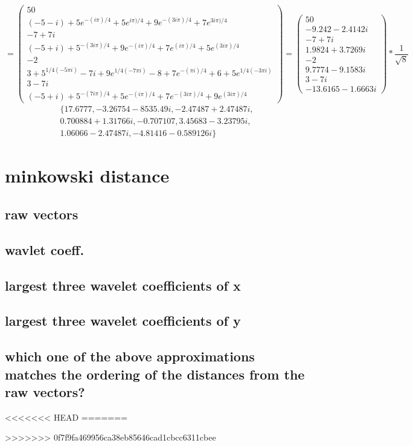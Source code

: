 \documentclass{article}
\begin{document}
\[
	=
	\begin{pmatrix}
	  50 \\
	  (-5-i)+5 e^{-(i \pi)/4}+5 e^{ i \pi)/4}+9 e^{-(3 i \pi)/4}+7 e^{3 i \pi)/4} \\
	  -7 + 7i \\
	  (-5+i)+5^{-(3 i \pi)/4}+9 e^{-(i \pi)/4}+7 e^{(i \pi)/4}+5 e^{(3 i \pi)/4} \\
	  -2 \\
	  3+5^{1/4 (-5 \pi i)}-7 i+9 e^{1/4 (-7 \pi i)}-8+7 e^{-(\pi i)/4}+6+5 e^{1/4 (-3 \pi i)} \\
	  3 - 7i \\
	  (-5+i)+5^{-(7 i \pi)/4}+5 e^{-(i \pi)/4}+7 e^{-(3 i \pi)/4}+9 e^{(3 i \pi)/4}

	\end{pmatrix}
	=
	\begin{pmatrix}
	  50 \\
	  -9.242 - 2.4142 i \\
	  -7 + 7i \\
	  1.9824 + 3.7269 i \\
	  -2 \\
	  9.7774 - 9.1583 i \\
	  3 - 7i \\
	  -13.6165 - 1.6663 i

	\end{pmatrix}
	*
   \frac{1}{\sqrt{8}} 
\]
\begin{align*}
  \{ 17.6777, -3.26754-8535.49 i, -2.47487+2.47487 i,\\
  0.700884+1.31766 i, -0.707107, 3.45683-3.23795 i, \\
  1.06066-2.47487 i, -4.81416-0.589126 i \}
\end{align*}

\section{minkowski distance}

\subsection{raw vectors}


\subsection{wavlet coeff.}


\subsection{largest three wavelet coefficients of x}


\subsection{largest three wavelet coefficients of y}


\subsection{which one of the above approximations matches the ordering of the distances from 
the raw vectors?}






<<<<<<< HEAD
=======

>>>>>>> 0f7f9fa469956ca38eb85646cad1cbcc6311cbee
\end{document}
